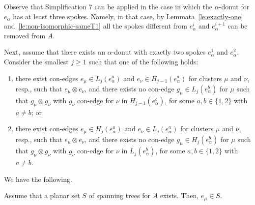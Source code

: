 \documentclass[letter,runningheads]{llncs}
\newcommand{\conf}{\otimes}
\begin{document}
Observe that Simplification 7 can be applied in the case in which the $\alpha$-donut for $e_{\alpha}$ has at least three spokes. Namely, in that case, by Lemmata~\ref{le:exactly-one} and~\ref{le:non-isomorphic-sameT1} all the spokes different from $e^i_\alpha$ and $e^{i+1}_\alpha$ can be removed from $A$.



Next, assume that there exists an $\alpha$-donut with exactly two spokes $e^1_\alpha$ and $e^2_\alpha$. Consider the smallest $j\geq 1$ such that one of the following holds:

\begin{enumerate}
\item there exist con-edges $e_{\mu}\in L_j(e^a_{\alpha})$ and $e_{\nu}\in H_{j-1}(e^a_{\alpha})$ for clusters $\mu$ and $\nu$, resp., such that $e_{\mu}\conf e_{\nu}$, and there exists no con-edge $g_{\mu}\in L_j(e^b_{\alpha})$ for $\mu$ such that $g_{\mu}\conf g_{\nu}$ with $g_{\nu}$ con-edge for $\nu$ in $H_{j-1}(e^b_{\alpha})$, for some $a,b\in\{1,2\}$ with $a\neq b$; or
\item there exist con-edges $e_{\mu}\in H_j(e^a_{\alpha})$ and $e_{\nu}\in L_{j}(e^a_{\alpha})$ for clusters $\mu$ and $\nu$, resp., such that $e_{\mu}\conf e_{\nu}$, and there exists no con-edge $g_{\mu}\in H_j(e^b_{\alpha})$ for $\mu$ such that $g_{\mu}\conf g_{\nu}$ with $g_{\nu}$ con-edge for $\nu$ in $L_{j}(e^b_{\alpha})$, for some $a,b\in\{1,2\}$ with $a\neq b$.
\end{enumerate}

We have the following.

\begin{lemma}[{\sc Simplification 8}] \label{le:non-isomorphic-differentTj}
Assume that a planar set $S$ of spanning trees for $A$ exists. Then, $e_{\mu}\in S$.
\end{lemma}
\end{document}
